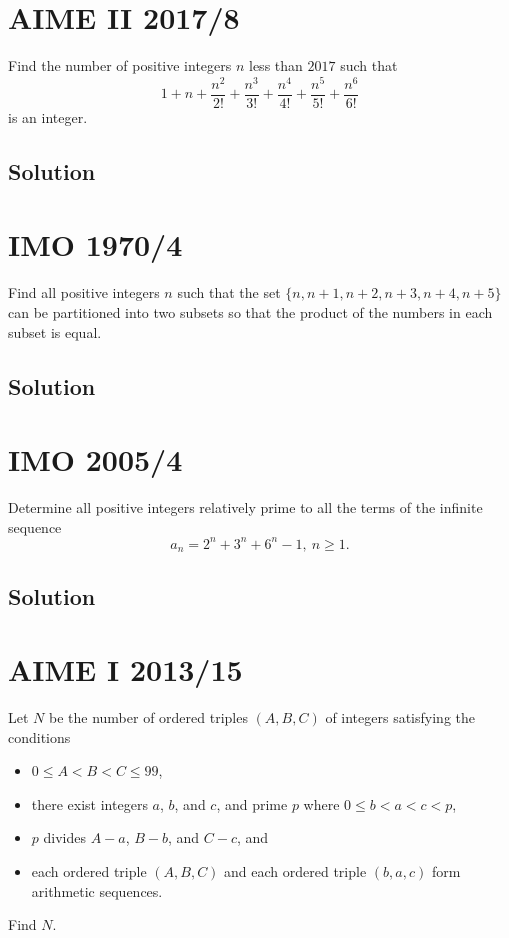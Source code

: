 \documentclass[mast]{lucky}
\begin{document}
\pagebreak\section{AIME II 2017/8}

Find the number of positive integers $n$ less than $2017$ such that
\[ 1+n+\frac{n^2}{2!}+\frac{n^3}{3!}+\frac{n^4}{4!}+\frac{n^5}{5!}+\frac{n^6}{6!} \]is an integer.

\subsection{Solution}

\pagebreak\section{IMO 1970/4}

Find all positive integers $n$ such that the set $\{n,n+1,n+2,n+3,n+4,n+5\}$ can be partitioned into two subsets so that the product of the numbers in each subset is equal.

\subsection{Solution}

\pagebreak\section{IMO 2005/4}

Determine all positive integers relatively prime to all the terms of the infinite sequence
\[a_n=2^n+3^n+6^n -1,\ n\geq 1.\]

\subsection{Solution}

\pagebreak\section{AIME I 2013/15}

Let $N$ be the number of ordered triples $(A,B,C)$ of integers satisfying the conditions
\begin{itemize}
\item $0\le A<B<C\le99$,
\item there exist integers $a$, $b$, and $c$, and prime $p$ where $0\le b<a<c<p$,
\item $p$ divides $A-a$, $B-b$, and $C-c$, and
\item each ordered triple $(A,B,C)$ and each ordered triple $(b,a,c)$ form arithmetic sequences.
\end{itemize}
Find $N$.
\end{document}
